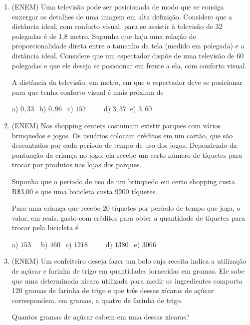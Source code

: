 \begin{multicols*}{2}
    \begin{enumerate}

        \item (ENEM) Uma televisão pode ser posicionada de modo que se consiga enxergar os detalhes de uma imagem em alta definição. Considere que a distância ideal, com conforto visual, para se assistir à televisão de 32 polegadas
              é de 1,8 metro. Supunha que haja uma relação de proporcionalidade direta entre o tamanho da tela (medido
              em polegada) e a distância ideal. Considere que um espectador dispõe de uma televisão de 60 polegadas e que
              ele deseja se posicionar em frente a ela, com conforto visual.

              A distância da televisão, em metro, em que o espectador deve se posicionar para que tenha conforto visual é mais
              próxima de

              a) $0,33 \ \ $ b) $0,96 \ \ $ c) $157 \ \ \ \ \ \ \ \ \ \ $ d) $3,37 \ $ e) $3,60 \ \ $

        \item (ENEM) Nos shopping centers costumam existir parques com vários brinquedos e jogos. Os usuários
              colocam créditos em um cartão, que são descontados por cada período de tempo de uso dos jogos. Dependendo da
              pontuação da criança no jogo, ela recebe um certo número de tíquetes para trocar por produtos nas lojas dos parques.

              Suponha que o período de uso de um brinquedo em certo shopping custa R\$3,00 e que uma bicicleta custa 9200 tíquetes.

              Para uma criança que recebe 20 tíquetes por período de tempo que joga, o valor, em reais, gasto com créditos para
              obter a quantidade de tíquetes para trocar pela bicicleta é

              a) $153 \ \ \ \ \ $ b) $460 \ \ $ c) $1218 \ \ \ \ \ \ \ \ \ \ $ d) $1380 \ \ $ e) $3066 \ \ $

        \item (ENEM) Um confeiteiro deseja fazer um bolo cuja receita indica a utilização de açúcar e farinha de trigo em
              quantidades fornecidas em gramas. Ele sabe que uma determinada xícara utilizada para medir os ingredientes
              comporta 120 gramas de farinha de trigo e que três dessas xícaras de açúcar correspondem, em gramas, a quatro de
              farinha de trigo.

              Quantos gramas de açúcar cabem em uma dessas xícaras?


\end{enumerate}
\end{multicols*}
